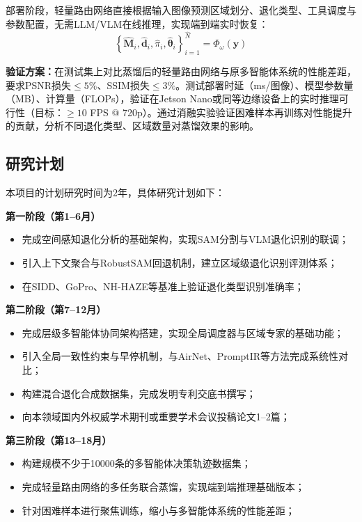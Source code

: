 部署阶段，轻量路由网络直接根据输入图像预测区域划分、退化类型、工具调度与参数配置，无需LLM/VLM在线推理，实现端到端实时恢复：
\begin{equation}
\left\{\hat{\mathbf{M}}_i, \hat{\mathbf{d}}_i, \hat{\pi}_i, \hat{\boldsymbol{\theta}}_i\right\}_{i=1}^{\hat{N}} = \Phi_{\omega}(\mathbf{y})
\end{equation}

\textbf{验证方案：}在测试集上对比蒸馏后的轻量路由网络与原多智能体系统的性能差距，要求PSNR损失$\leq 5\%$、SSIM损失$\leq 3\%$。测试部署时延（ms/图像）、模型参数量（MB）、计算量（FLOPs），验证在Jetson Nano或同等边缘设备上的实时推理可行性（目标：$\geq 10$ FPS @ 720p）。通过消融实验验证困难样本再训练对性能提升的贡献，分析不同退化类型、区域数量对蒸馏效果的影响。


\subsection{研究计划}

本项目的计划研究时间为2年，具体研究计划如下：

\textbf{第一阶段（第1–6月）}

\begin{itemize}
\item 完成空间感知退化分析的基础架构，实现SAM分割与VLM退化识别的联调；
\item 引入上下文聚合与RobustSAM回退机制，建立区域级退化识别评测体系；
\item 在SIDD、GoPro、NH-HAZE等基准上验证退化类型识别准确率；
\end{itemize}

\textbf{第二阶段（第7–12月）}

\begin{itemize}
\item 完成层级多智能体协同架构搭建，实现全局调度器与区域专家的基础功能；
\item 引入全局一致性约束与早停机制，与AirNet、PromptIR等方法完成系统性对比；
\item 构建混合退化合成数据集，完成发明专利交底书撰写；
\item 向本领域国内外权威学术期刊或重要学术会议投稿论文1–2篇；
\end{itemize}

\textbf{第三阶段（第13–18月）}

\begin{itemize}
\item 构建规模不少于10000条的多智能体决策轨迹数据集；
\item 完成轻量路由网络的多任务联合蒸馏，实现端到端推理基础版本；
\item 针对困难样本进行聚焦训练，缩小与多智能体系统的性能差距；
\end{itemize}

